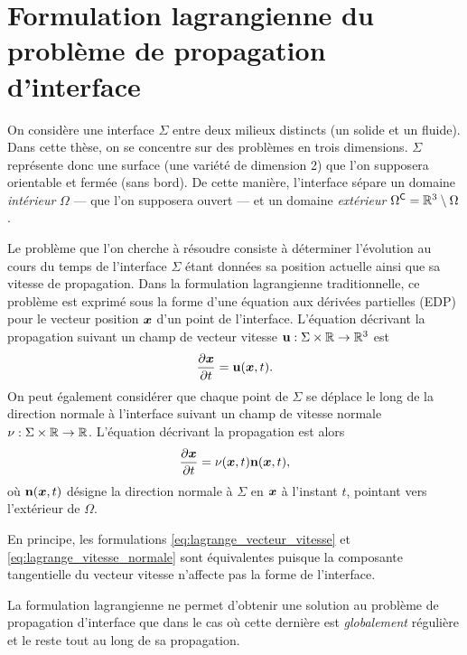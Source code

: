 \section{Formulation lagrangienne du problème de propagation d'interface}
On considère une interface $\Sigma$ entre deux milieux distincts (\eg un solide et un fluide).
Dans cette thèse, on se concentre sur des problèmes en trois dimensions. 
$\Sigma$ représente donc une surface (\ie une variété de dimension 2) que l’on supposera orientable et fermée (\ie sans bord).
De cette manière, l'interface sépare un domaine \textit{intérieur} $\Omega$ --- que l'on supposera ouvert --- et un domaine \textit{extérieur} $\Omega^\mathsf{C} = \mathbb{R}^3 \setminus \Omega$.
\par
Le problème que l'on cherche à résoudre consiste à déterminer l’évolution au cours du temps de l'interface $\Sigma$ étant données sa position actuelle ainsi que sa vitesse de propagation.
Dans la formulation lagrangienne traditionnelle, ce problème est exprimé sous la forme d'une équation aux dérivées partielles (EDP) pour le vecteur position $\bm{x}$ d'un point de l'interface.
L'équation décrivant la propagation suivant un champ de vecteur vitesse $\mathbf{u} : \Sigma \times \mathbb{R} \to \mathbb{R}^3$ est
\begin{equation}
	\frac{\partial \bm{x}}{\partial t} = \mathbf{u}(\bm{x},t).
	\label{eq:lagrange_vecteur_vitesse}
\end{equation}
On peut également considérer que chaque point de $\Sigma$ se déplace le long de la direction normale à l'interface suivant un champ de vitesse normale $\nu : \Sigma \times \mathbb{R} \to \mathbb{R}$. 
L'équation décrivant la propagation est alors
\begin{equation}
	\frac{\partial \bm{x}}{\partial t} = \nu(\bm{x},t) \mathbf{n}(\bm{x},t),
	\label{eq:lagrange_vitesse_normale}
\end{equation}
où $\mathbf{n}(\bm{x},t)$ désigne la direction normale à $\Sigma$ en $\bm{x}$ à l'instant $t$, pointant vers l'extérieur de $\Omega$.
\par\bigskip
En principe, les formulations \eqref{eq:lagrange_vecteur_vitesse} et \eqref{eq:lagrange_vitesse_normale} sont équivalentes puisque la composante tangentielle du vecteur vitesse n'affecte pas la forme de l'interface. 
\par\bigskip
La formulation lagrangienne ne permet d'obtenir une solution au problème de propagation d'interface que dans le cas où cette dernière est \textit{globalement} régulière et le reste tout au long de sa propagation. 
